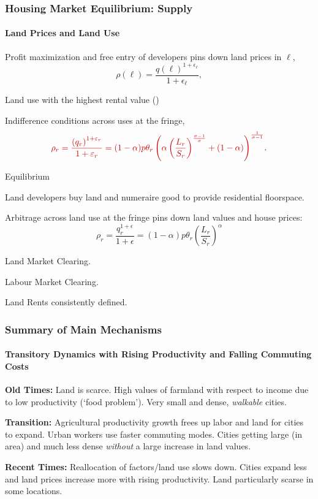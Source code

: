 \documentclass[aspectratio=169]{beamer}
\begin{document}
\begin{v75mins}
\begin{frame}
\frametitle{Housing Market Equilibrium: Supply}
\framesubtitle{Land Prices and Land Use}
\bi
\item Profit maximization and free entry of developers pins down land prices in $\ell$,
\begin{equation*}
\rho(\ell)=\frac{q(\ell)^{1+\epsilon_{\ell}}}{ 1+\epsilon_{\ell}},
\end{equation*}
\item Land use with the highest rental value ()
\item Indifference conditions across uses at the fringe,
\begin{equation*}
 \re{\rho_r=\frac{\left( q_r \right)^{1+\varepsilon_r}}{1+\varepsilon_r} = (1-\alpha)p\theta_r\left(\alpha \left(\frac{L_r}{S_r}\right)^{\frac{\sigma-1}{\sigma}} +(1-\alpha) \right)^{\frac{1}{\sigma-1}}}.
\end{equation*}
\ei
\end{frame}
\end{v75mins}


\begin{frame}{Equilibrium}

	\begin{midi}
		\item Land developers buy land and numeraire good to provide residential floorspace.
		\item Arbitrage across land use at the fringe pins down land values and house prices:
		\begin{equation*}
			\rho_r = \frac{q_r^{1+\epsilon}}{1+\epsilon} = (1-\alpha)p \theta_r \left(\frac{L_r}{S_r}\right)^\alpha
		\end{equation*}
		\item Land Market Clearing.
		\item Labour Market Clearing.
		\item Land Rents consistently defined.
	\end{midi}

\end{frame}

\begin{frame}
	\frametitle{Summary of Main Mechanisms}
	\framesubtitle{Transitory Dynamics with Rising Productivity and Falling Commuting Costs}
	
	\begin{widei}
	\item<1-> \textbf{Old Times:} Land is scarce. High values of farmland with respect to income due to low productivity (`food problem'). Very small and dense, \emph{walkable} cities.
	\item<2-> \textbf{Transition:} Agricultural productivity growth frees up labor and land for cities to expand. Urban workers use faster commuting modes. Cities getting large (in area) and much less dense \emph{without} a large increase in land values.
	\item<3-> \textbf{Recent Times:} Reallocation of factors/land use slows down. Cities expand less and land prices increase more with rising productivity. Land particularly scarse in some locations.
	\end{widei}
	\end{frame}
\end{document}
